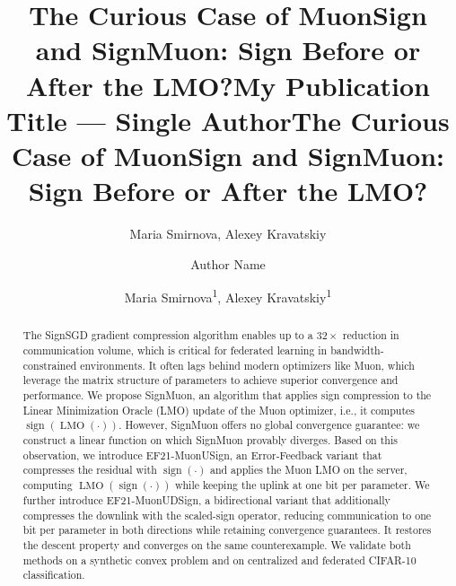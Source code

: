\documentclass[letterpaper]{article} %
\title{The Curious Case of MuonSign and SignMuon: Sign Before or After the LMO?}
\author{
    Maria Smirnova,
    Alexey Kravatskiy
}
\title{My Publication Title --- Single Author}
\author {
    Author Name
}
\title{The Curious Case of MuonSign and SignMuon: Sign Before or After the LMO?}
\author {
    Maria Smirnova\textsuperscript{\rm 1}\equalcontrib,
    Alexey Kravatskiy\textsuperscript{\rm 1}\corresponding
}
\begin{document}
\maketitle

\begin{abstract}\label{sec:abs}
The SignSGD gradient compression algorithm enables up to a $32\times$ reduction in communication volume, which is critical for federated learning in bandwidth-constrained environments. It often lags behind modern optimizers like Muon, which leverage the matrix structure of parameters to achieve superior convergence and performance. We propose SignMuon, an algorithm that applies sign compression to the Linear Minimization Oracle (LMO) update of the Muon optimizer, i.e., it computes $\operatorname{sign}(\operatorname{LMO}(\cdot))$. However, SignMuon offers no global convergence guarantee: we construct a linear function on which SignMuon provably diverges. Based on this observation, we introduce EF21-MuonUSign, an Error-Feedback variant that compresses the residual with $\operatorname{sign}(\cdot)$ and applies the Muon LMO on the server, computing $\operatorname{LMO}(\operatorname{sign}(\cdot))$ while keeping the uplink at one bit per parameter. We further introduce EF21-MuonUDSign, a bidirectional variant that additionally compresses the downlink with the scaled-sign operator, reducing communication to one bit per parameter in both directions while retaining convergence guarantees. It restores the descent property and converges on the same counterexample. We validate both methods on a synthetic convex problem and on centralized and federated CIFAR-10 classification.
\end{abstract}


\end{document}
